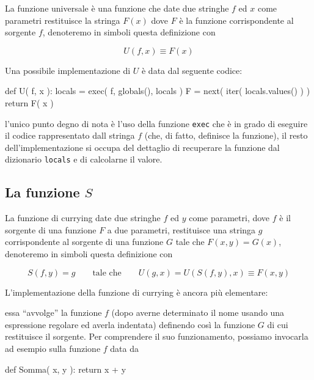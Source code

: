 \documentclass[a4paper]{article}
\begin{document}
La funzione universale è una funzione che date due stringhe $f$ ed $x$ come
parametri restituisce la stringa $F(x)$ dove $F$ è la funzione corrispondente
al sorgente $f$, denoteremo in simboli questa definizione con

\[
  U( f, x ) \equiv F( x )
\]

Una possibile implementazione di $U$ è data dal seguente codice:

\begin{pycode}
def U( f, x ):
  locals = {}
  exec( f, globals(), locals )
  F = next( iter( locals.values() ) )
  return F( x )
\end{pycode}

l'unico punto degno di nota è l'uso della funzione \verb|exec| che è in grado
di eseguire il codice rappresentato dall stringa $f$ (che, di fatto, definisce
la funzione), il resto dell'implementazione si occupa del dettaglio di
recuperare la funzione dal dizionario \verb|locals| e di calcolarne il valore.

\subsection*{La funzione $S$}

La funzione di currying date due stringhe $f$ ed $y$ come parametri, dove $f$
è il sorgente di una funzione $F$ a due parametri, restituisce una stringa $g$
corrispondente al sorgente di una funzione $G$ tale che $F(x,y)=G(x)$,
denoteremo in simboli questa definizione con

\[
  S( f, y ) = g \qquad\text{tale che}\qquad U( g, x ) = U( S( f, y ), x ) \equiv F( x, y )
\]

L'implementazione della funzione di currying è ancora più elementare:


essa ``avvolge'' la funzione $f$ (dopo averne determinato il nome usando una
espressione regolare ed averla indentata) definendo così la funzione $G$ di
cui restituisce il sorgente. Per comprendere il suo funzionamento, possiamo
invocarla ad esempio sulla funzione $f$ data da

\begin{pycode}
def Somma( x, y ):
	return x + y
\end{pycode}
\end{document}
